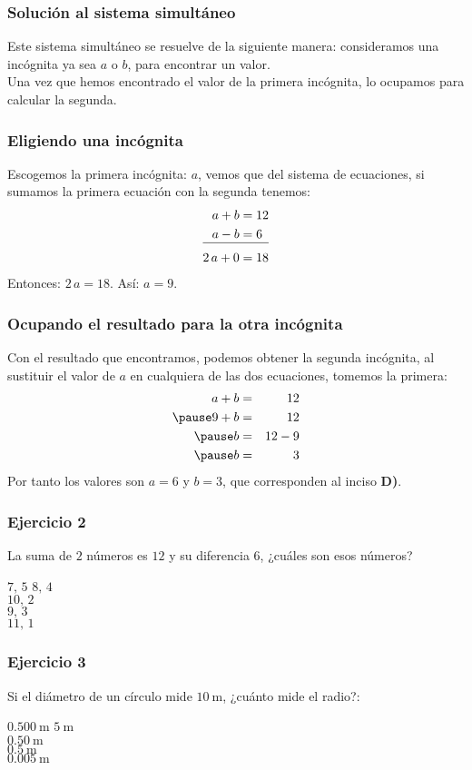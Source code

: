 \begin{frame}
\frametitle{Solución al sistema simultáneo}
Este sistema simultáneo se resuelve de la siguiente manera: consideramos una incógnita ya sea $a$ o $b$, para encontrar un valor.
\\
\bigskip
\pause
Una vez que hemos encontrado el valor de la primera incógnita, lo ocupamos para calcular la segunda.
\end{frame}
\begin{frame}
\frametitle{Eligiendo una incógnita}
Escogemos la primera incógnita: $a$, vemos que del sistema de ecuaciones, si sumamos la primera ecuación con la segunda tenemos:
\begin{align*}
a + b &= 12 \\
a - b &= 6 \\[-11pt]
\cline{1-2} 
2 \, a + 0 &= 18
\end{align*}
\pause
Entonces: $2 \, a =  18$. \hspace{1.5cm} \pause Así: $a = 9$.
\end{frame}
\begin{frame}
\frametitle{Ocupando el resultado para la otra incógnita}
Con el resultado que encontramos, podemos obtener la segunda incógnita, al sustituir el valor de $a$ en cualquiera de las dos ecuaciones, tomemos la primera:
\pause
\begin{eqnarray*}
a + b &=& 12 \\ \pause
9 + b &=& 12 \\ \pause
b &=& 12 - 9 \\ \pause
b &=& 3
\end{eqnarray*}
\pause
Por tanto los valores son $a = 6$ y $b = 3$, que corresponden al inciso \textbf{D)}.
\end{frame}
\begin{frame}
\frametitle{Ejercicio 2}
La suma de $2$ números es $12$ y su diferencia $6$, ¿cuáles son esos números?
\begin{choices}
\choice $7,\, 5$
\choice $8,  \, 4$ \\
\choice $10, \, 2$ \\
\choice $9, \, 3$ \\
\choice $11, \, 1$ \\
\end{choices}
\end{frame}
\begin{frame}
\frametitle{Ejercicio 3}
Si el diámetro de un círculo mide $\SI{10}{\meter}$, ¿cuánto mide el radio?:
\begin{choices}
\choice $\SI{0.500}{\meter}$
\choice $\SI{5}{\meter}$ \\
\choice $\SI{0.50}{\meter}$ \\
\choice $\SI{0.5}{\meter}$ \\
\choice $\SI{0.005}{\meter}$ \\
\end{choices}
\pause
{}
\end{frame}
